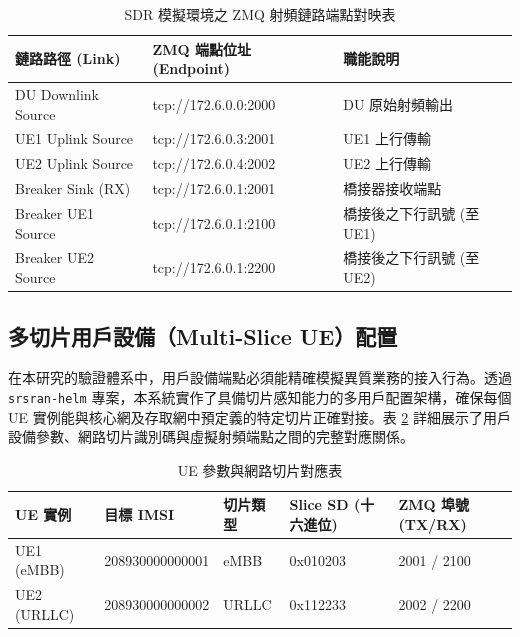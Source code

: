 \begin{table}[htbp]
    \centering
    \caption{SDR 模擬環境之 ZMQ 射頻鏈路端點對映表}
    \label{tab:zmq_endpoint_mapping_detail}
    \begin{tabular}{|l|l|l|}
    \hline
    \textbf{鏈路路徑 (Link)} & \textbf{ZMQ 端點位址 (Endpoint)} & \textbf{職能說明} \\ \hline
    DU Downlink Source & tcp://172.6.0.0:2000 & DU 原始射頻輸出 \\ \hline
    UE1 Uplink Source & tcp://172.6.0.3:2001 & UE1 上行傳輸 \\ \hline
    UE2 Uplink Source & tcp://172.6.0.4:2002 & UE2 上行傳輸 \\ \hline
    Breaker Sink (RX) & tcp://172.6.0.1:2001 & 橋接器接收端點 \\ \hline
    Breaker UE1 Source & tcp://172.6.0.1:2100 & 橋接後之下行訊號 (至 UE1) \\ \hline
    Breaker UE2 Source & tcp://172.6.0.1:2200 & 橋接後之下行訊號 (至 UE2) \\ \hline
    \end{tabular}
\end{table}

\subsection{多切片用戶設備（Multi-Slice UE）配置}
\label{subsec:multi_slice_ue_config}

在本研究的驗證體系中，用戶設備端點必須能精確模擬異質業務的接入行為。透過 \texttt{srsran-helm} 專案，本系統實作了具備切片感知能力的多用戶配置架構，確保每個 UE 實例能與核心網及存取網中預定義的特定切片正確對接。表 \ref{tab:ue_slice_mapping} 詳細展示了用戶設備參數、網路切片識別碼與虛擬射頻端點之間的完整對應關係。

\begin{table}[htbp]
    \centering
    \caption{UE 參數與網路切片對應表}
    \label{tab:ue_slice_mapping}
    \begin{tabular}{|l|l|l|l|l|}
    \hline
    \textbf{UE 實例} & \textbf{目標 IMSI} & \textbf{切片類型} & \textbf{Slice SD (十六進位)} & \textbf{ZMQ 埠號 (TX/RX)} \\ \hline
    UE1 (eMBB) & 208930000000001 & eMBB & 0x010203 & 2001 / 2100 \\ \hline
    UE2 (URLLC) & 208930000000002 & URLLC & 0x112233 & 2002 / 2200 \\ \hline
    \end{tabular}
\end{table}

